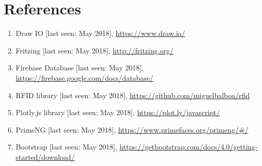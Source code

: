 \documentclass[a4paper,11pt]{article}
\begin{document}
\newpage
\section{References}
\begin{enumerate}
\item Draw IO [last seen: May 2018], \url{https://www.draw.io/}
\item Fritzing [last seen: May 2018], \url{http://fritzing.org/}
\item Firebase Database [last seen: May 2018], \url{https://firebase.google.com/docs/database/}
\item RFID library [last seen: May 2018], \url{https://github.com/miguelbalboa/rfid}
\item Plotly.js library [last seen: May 2018], \url{https://plot.ly/javascript/}
\item PrimeNG [last seen: May 2018], \url{https://www.primefaces.org/primeng/#/}
\item Bootstrap  [last seen: May 2018], \url{https://getbootstrap.com/docs/4.0/getting-started/download/}
\end{enumerate}
\end{document}
